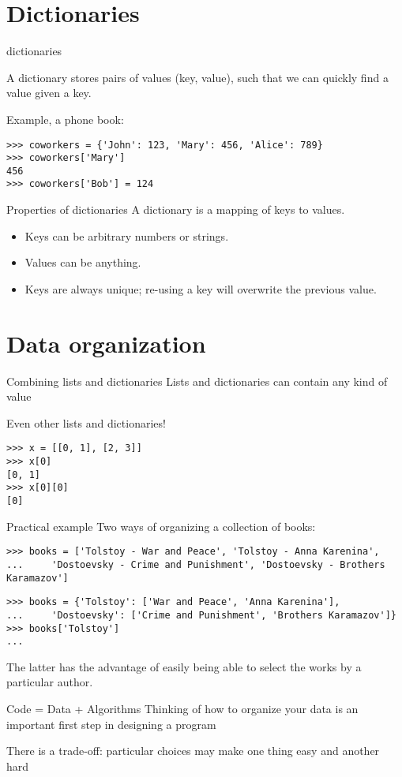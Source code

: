 \documentclass{beamer}
\begin{document}
\frame{\tableofcontents[currentsection]}
\section{Dictionaries}
\begin{frame}[fragile]{dictionaries}
    \begin{definition}
        A dictionary stores pairs of values (key, value),
        such that we can quickly find a value given a key.
    \end{definition}
Example, a phone book:
\begin{lstlisting}
>>> coworkers = {'John': 123, 'Mary': 456, 'Alice': 789}
>>> coworkers['Mary']
456
>>> coworkers['Bob'] = 124
\end{lstlisting}
\end{frame}

\begin{frame}{Properties of dictionaries}
A dictionary is a mapping of keys to values.

    \begin{itemize}
        \item Keys can be arbitrary numbers or strings.
        \item Values can be anything.
        \item Keys are always unique;
            re-using a key will overwrite the previous value.
    \end{itemize}
\end{frame}



\frame{\tableofcontents[currentsection]}
\section{Data organization}
\begin{frame}[fragile]{Combining lists and dictionaries}
Lists and dictionaries can contain any kind of value

Even other lists and dictionaries!

\begin{lstlisting}
>>> x = [[0, 1], [2, 3]]
>>> x[0]
[0, 1]
>>> x[0][0]
[0]
\end{lstlisting}
\end{frame}

\begin{frame}[fragile]{Practical example}
Two ways of organizing a collection of books:
\begin{lstlisting}
>>> books = ['Tolstoy - War and Peace', 'Tolstoy - Anna Karenina',
...     'Dostoevsky - Crime and Punishment', 'Dostoevsky - Brothers Karamazov']
\end{lstlisting}

\pause
\begin{lstlisting}
>>> books = {'Tolstoy': ['War and Peace', 'Anna Karenina'],
...     'Dostoevsky': ['Crime and Punishment', 'Brothers Karamazov']}
>>> books['Tolstoy']
...
\end{lstlisting}
The latter has the advantage of easily being able to
select the works by a particular author.
\end{frame}

\begin{frame}{Code = Data + Algorithms}
    Thinking of how to organize your data
    is an important first step in designing a program

    There is a trade-off:
    particular choices may make one thing easy and another hard
\end{frame}
\end{document}
